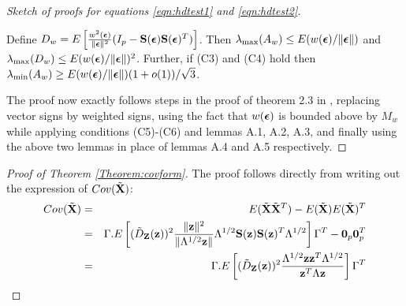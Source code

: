 \begin{proof}[Sketch of proofs for equations \ref{eqn:hdtest1} and \ref{eqn:hdtest2}]
\begin{Lemma}
Define $D_w = E \left[ \frac{w^2({\boldsymbol{\epsilon}})}{\| {\boldsymbol{\epsilon}} \|^2} (I_p - {\mathbf{S}}({\boldsymbol{\epsilon}}) {\mathbf{S}}({\boldsymbol{\epsilon}})^T )\right] $. Then $\lambda_{\max} (A_w) \leq E( w({\boldsymbol{\epsilon}})/\| {\boldsymbol{\epsilon}} \|)$ and $\lambda_{\max} (D_w) \leq E( w({\boldsymbol{\epsilon}})/\| {\boldsymbol{\epsilon}} \|)^2$. Further, if (C3) and (C4) hold then $\lambda_{\min} (A_w) \geq E( w({\boldsymbol{\epsilon}})/\| {\boldsymbol{\epsilon}} \|)(1+o(1))/\sqrt 3$.
\end{Lemma}
%
The proof now exactly follows steps in the proof of theorem 2.3 in \cite{WangPengLi15}, replacing vector signs by weighted signs, using the fact that $w({\boldsymbol{\epsilon}})$ is bounded above by $M_w$ while applying conditions (C5)-(C6) and lemmas A.1, A.2, A.3, and finally using the above two lemmas in place of lemmas A.4 and A.5 respectively.
\end{proof}

\begin{proof}[Proof of Theorem  \ref{Theorem:covform}]
The proof follows directly from writing out the expression of $Cov ( \tilde {{\mathbf{X}}})$:
%
\begin{eqnarray*}
Cov(\tilde{{\mathbf{X}}}) &=& E(\tilde{{\mathbf{X}}} \tilde{{\mathbf{X}}}^T) - E(\tilde{{\mathbf{X}}}) E(\tilde{{\mathbf{X}}})^T\\
&=& \Gamma . E \left[ (\tilde D_{\mathbf{Z}}({\bf{z}}))^2 \frac{\|{\bf{z}}\|^2}{\| \Lambda^{1/2}{\bf{z}}\|} \Lambda^{1/2} {\mathbf{S}}({\bf{z}}) {\mathbf{S}}({\bf{z}})^T \Lambda^{1/2} \right] \Gamma^T - {\bf 0}_p {\bf 0}_p^T\\
&=& \Gamma .E \left[ (\tilde D_{\mathbf{Z}}({\bf{z}}))^2 \frac{\Lambda^{1/2} {\bf{z}} {\bf{z}}^T \Lambda^{1/2}}{{\bf{z}}^T \Lambda {\bf{z}}} \right] \Gamma^T
\end{eqnarray*}
%
\end{proof}

